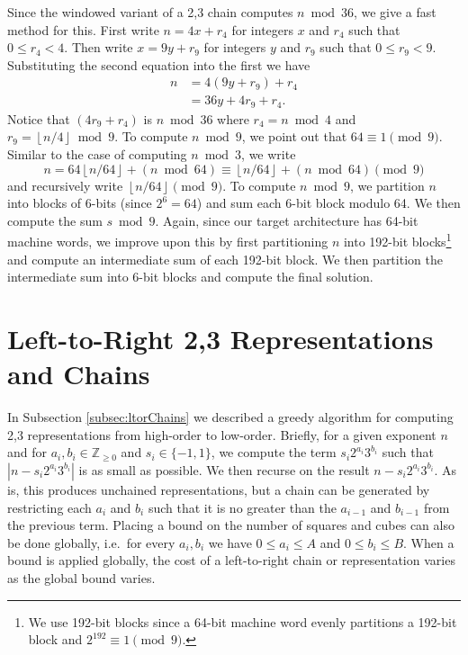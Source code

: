 \documentclass{ucalgthes1}
\theoremstyle{definition}
\newcommand{\ZZgez}{\mathbb{Z}_{\ge 0}}
\newcommand{\floor}[1]{\left\lfloor #1 \right\rfloor}
\begin{document}
Since the windowed variant of a 2,3 chain computes $n \bmod 36$, we give a fast method for this.  First write $n = 4x + r_4$ for integers $x$ and $r_4$ such that $0 \le r_4 < 4$.  Then write $x = 9y + r_9$ for integers $y$ and $r_9$ such that $0 \le r_9 < 9$.  Substituting the second equation into the first we have
\begin{align*}
	n &= 4(9y + r_9) + r_4 \\
	  &= 36y + 4r_9 + r_4.
\end{align*}
Notice that $(4r_9 + r_4)$ is $n \bmod {36}$ where $r_4 = n \bmod 4$ and $r_9 = \floor{n/4} \bmod 9$. To compute $n \bmod 9$, we point out that $64 \equiv 1 \pmod 9$.  Similar to the case of computing $n \bmod 3$, we write
\[
	n = 64 \floor{n/64} + (n \bmod 64) \equiv \floor{n/64} + (n \bmod 64) \pmod 9
\]
and recursively write $\floor{n/64} \pmod 9$.  To compute $n \bmod 9$, we partition $n$ into blocks of 6-bits (since $2^6 = 64$) and sum each 6-bit block modulo 64.  We then compute the sum $s \bmod 9$.  Again, since our target architecture has 64-bit machine words, we improve upon this by first partitioning $n$ into 192-bit blocks\footnote{We use 192-bit blocks since a 64-bit machine word evenly partitions a 192-bit block and $2^{192} \equiv 1 \pmod 9$.} and compute an intermediate sum of each 192-bit block.  We then partition the intermediate sum into 6-bit blocks and compute the final solution.



\section{Left-to-Right 2,3 Representations and Chains}
\label{sec:ltorChains2}

In Subsection \ref{subsec:ltorChains} we described a greedy algorithm for computing 2,3 representations from high-order to low-order.  Briefly, for a given exponent $n$ and for $a_i, b_i \in \ZZgez$ and \mbox{$s_i \in \{-1, 1\}$}, we compute the term $s_i2^{a_i}3^{b_i}$ such that $\left|n-s_i2^{a_i}3^{b_i}\right|$ is as small as possible.  We then recurse on the result $n - s_i2^{a_i}3^{b_i}$.  As is, this produces unchained representations, but a chain can be generated by restricting each $a_i$ and $b_i$ such that it is no greater than the $a_{i-1}$ and $b_{i-1}$ from the previous term.  Placing a bound on the number of squares and cubes can also be done globally, i.e.\ for every $a_i, b_i$ we have $0 \le a_i \le A$ and $0 \le b_i \le B$. When a bound is applied globally, the cost of a left-to-right chain or representation varies as the global bound varies.
\end{document}
